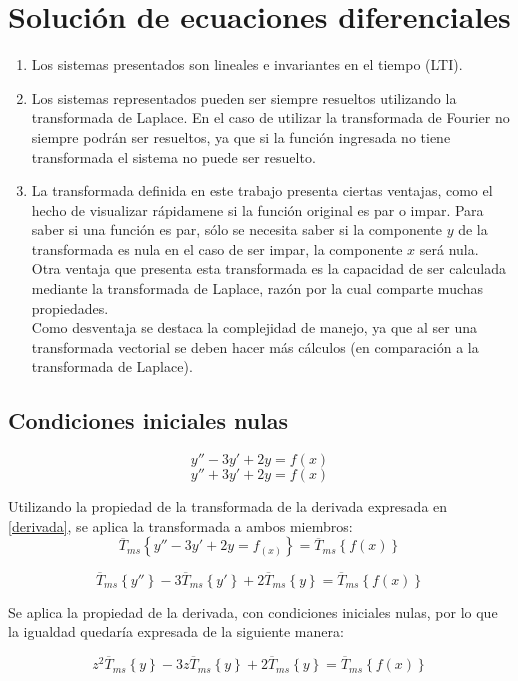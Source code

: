 \documentclass[12pt]{article}
\begin{document}
\section{Solución de ecuaciones diferenciales}
\begin{enumerate}[label=(\alph*)]
\item Los sistemas presentados son lineales e invariantes en el tiempo (LTI).
\item Los sistemas representados pueden ser siempre resueltos utilizando la transformada de Laplace. En el caso de utilizar la transformada de Fourier no siempre podrán ser resueltos, ya que si la función ingresada no tiene transformada el sistema no puede ser resuelto.
\item La transformada definida en este trabajo presenta ciertas ventajas, como el  hecho de visualizar rápidamene si la función original es par o impar. Para saber si una función es par, sólo se necesita saber si la componente $y$ de la transformada es nula en el caso de ser impar, la componente $x$ será nula. Otra ventaja que presenta esta transformada es la capacidad de ser calculada mediante la transformada de Laplace, razón por la cual comparte muchas propiedades.\\

Como desventaja se destaca la complejidad de manejo, ya que al ser una transformada vectorial se deben hacer más cálculos  (en comparación a la transformada de Laplace).
\end{enumerate}
\subsection{Condiciones iniciales nulas}
\label{condiciones_iniciales_nulas}
$$y''-3y'+2y=f(x)$$
$$
y''+3y'+2y=f(x)
$$

Utilizando la propiedad de la transformada de la derivada expresada en \ref{derivada}, se aplica la transformada a ambos miembros:
$$
\overline{T}_{ms}\left\{y''-3y'+2y=f_{(x)}\right\} = \overline{T}_{ms}\left\{f(x)\right\}
$$

$$
\overline{T}_{ms}\left\{y''\right\} -3\overline{T}_{ms}\left\{y'\right\} +2\overline{T}_{ms}\left\{y\right\} = \overline{T}_{ms}\left\{f(x)\right\}
$$

Se aplica la propiedad de la derivada, con condiciones iniciales nulas, por lo que la igualdad quedaría expresada de la siguiente manera:


$$z^2 \overline{T}_{ms}\left\{y\right\} - 3z\overline{T}_{ms}\left\{y\right\}+2\overline{T}_{ms}\left\{y\right\} =\overline{T}_{ms}\left\{f(x)\right\}
$$
\end{document}

